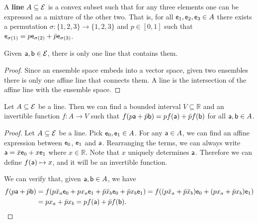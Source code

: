 \begin{mathSection}
\begin{defn}
	A \textbf{line} $A \subseteq \Ens$ is a convex subset such that for any three elements one can be expressed as a mixture of the other two. That is, for all $\ens_1, \ens_2, \ens_3 \in A$ there exists a permutation $\sigma : \{1,2,3\} \to \{1,2,3\}$ and $p \in [0,1]$ such that $\ens_{\sigma(1)} = p \ens_{\sigma(2)} + \bar{p} \ens_{\sigma(3)}$.
\end{defn}

\begin{prop}
	Given $\ens[a], \ens[b] \in \Ens$, there is only one line that contains them.
\end{prop}

\begin{proof}
	Since an ensemble space embeds into a vector space, given two ensembles there is only one affine line that connects them. A line is the intersection of the affine line with the ensemble space.
\end{proof}

\begin{thrm}
	Let $A \subseteq \Ens$ be a line. Then we can find a bounded interval $V \subseteq \mathbb{R}$ and an invertible function $f : A \to V$ such that $f(p \ens[a] + \bar{p} \ens[b]) = p f(\ens[a]) + \bar{p} f(\ens[b])$ for all $\ens[a], \ens[b] \in A$.
\end{thrm}

\begin{proof}
	Let $A \subseteq \Ens$ be a line. Pick $\ens_0, \ens_1 \in A$. For any $\ens[a] \in A$, we can find an affine expression between $\ens_0$, $\ens_1$ and $\ens[a]$. Rearranging the terms, we can always write $\ens[a] = \bar{x}\ens_0 + x\ens_1$ where $x \in \mathbb{R}$. Note that $x$ uniquely determines $\ens[a]$. Therefore we can define $f(\ens[a]) \mapsto x$, and it will be an invertible function.
	
	We can verify that, given $\ens[a], \ens[b] \in A$, we have
	\begin{equation}
		\begin{aligned}
			f(p\ens[a] + \bar{p} \ens[b]) &= f(p\bar{x}_a \ens_0 + px_a \ens_1 + \bar{p}\bar{x}_b \ens_0 + \bar{p}x_b \ens_1) = f((p\bar{x}_a + \bar{p}\bar{x}_b) \ens_0 + (px_a + \bar{p}x_b) \ens_1) \\
			&= px_a + \bar{p}x_b = pf(\ens[a]) + \bar{p}f(\ens[b]).
		\end{aligned}
	\end{equation}
	

\end{proof}
\end{mathSection}
